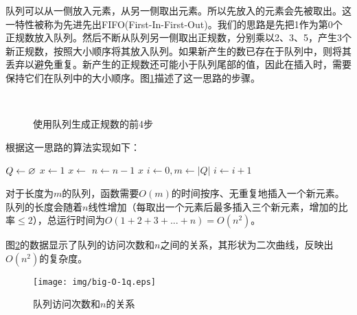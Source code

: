 \documentclass[b5paper]{ctexart}
\begin{document}
队列可以从一侧放入元素，从另一侧取出元素。所以先放入的元素会先被取出。这一特性被称为先进先出FIFO(First-In-First-Out)。我们的思路是先把1作为第0个正规数放入队列。然后不断从队列另一侧取出正规数，分别乘以2、3、5，产生3个新正规数，按照大小顺序将其放入队列。如果新产生的数已存在于队列中，则将其丢弃以避免重复。新产生的正规数还可能小于队列尾部的值，因此在插入时，需要保持它们在队列中的大小顺序。图\ref{fig:queues}描述了这一思路的步骤。

\begin{figure}[htbp]
  \centering
  \hspace{.1\textwidth}
  \\
  \hspace{.1\textwidth}
  \caption{使用队列生成正规数的前4步} \label{fig:queues}
\end{figure}

根据这一思路的算法实现如下：

\begin{algorithmic}[1]
  \State $Q \gets \varnothing$
  \State $x \gets 1$
  \State {}
    \State $x \gets$ 
    \State {}
    \State {}
    \State {}
    \State $n \gets n-1$
  \EndWhile
  \State \Return $x$
\EndFunction
\Statex
{}
  \State $i \gets 0, m \gets |Q|$
    \State $i \gets i + 1$
  \EndWhile
    \State {}
  \EndIf
\EndFunction
\end{algorithmic}

对于长度为$m$的队列，函数需要$O(m)$的时间按序、无重复地插入一个新元素。队列的长度会随着$n$线性增加（每取出一个元素后最多插入三个新元素，增加的比率$\leq 2$），总运行时间为$O(1 + 2 + 3 + ... + n) = O(n^2)$。

图\ref{fig:big-O-1q}的数据显示了队列的访问次数和$n$之间的关系，其形状为二次曲线，反映出$O(n^2)$的复杂度。

\begin{figure}[htbp]
  \centering
  \texttt{[image: img/big-O-1q.eps]}
  \caption{队列访问次数和$n$的关系} \label{fig:big-O-1q}
\end{figure}
\end{document}

